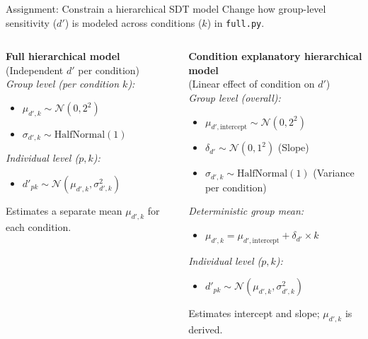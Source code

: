 \documentclass[aspectratio=169]{beamer}
\begin{document}
\begin{frame}[fragile]{Assignment: Constrain a hierarchical SDT model}
    Change how group-level sensitivity ($d'$) is modeled across conditions ($k$) in \texttt{full.py}.

    \begin{columns}[T] %
        \begin{column}{0.45\textwidth}
            \textbf{Full hierarchical model} \\
            (Independent $d'$ per condition) \\
            \textit{Group level (per condition $k$):}
            \begin{itemize}
                \item $\mu_{d',k} \sim \mathcal{N}(0, 2^2)$
                \item $\sigma_{d',k} \sim \text{HalfNormal}(1)$
            \end{itemize}
            \textit{Individual level ($p, k$):}
            \begin{itemize}
                \item $d'_{pk} \sim \mathcal{N}(\mu_{d',k}, \sigma_{d',k}^2)$
            \end{itemize}
            Estimates a separate mean $\mu_{d',k}$ for each condition.
        \end{column}

        \begin{column}{0.6\textwidth}
            \textbf{Condition explanatory hierarchical model} \\
            (Linear effect of condition on $d'$) \\
            \textit{Group level (overall):}
            \begin{itemize}
                \item $\mu_{d',\text{intercept}} \sim \mathcal{N}(0, 2^2)$
                \item $\delta_{d'} \sim \mathcal{N}(0, 1^2)$ (Slope)
                \item $\sigma_{d',k} \sim \text{HalfNormal}(1)$ (Variance per condition)
            \end{itemize}
            \textit{Deterministic group mean:}
            \begin{itemize}
                \item $\mu_{d',k} = \mu_{d',\text{intercept}} + \delta_{d'} \times k$
            \end{itemize}
            \textit{Individual level ($p, k$):}
            \begin{itemize}
                \item $d'_{pk} \sim \mathcal{N}(\mu_{d',k}, \sigma_{d',k}^2)$
            \end{itemize}
            Estimates intercept and slope; $\mu_{d',k}$ is derived.
        \end{column}
    \end{columns}
\end{frame}

\maketitle
\end{document}
